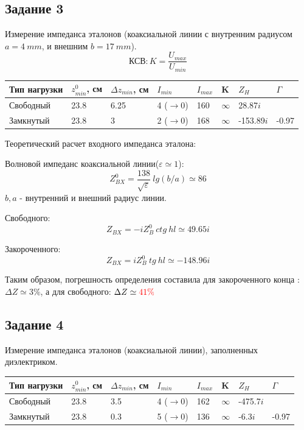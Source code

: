 \subsection{Задание 3}
Измерение импеданса эталонов (коаксиальной линии с внутренним радиусом $a = 4~mm$, и внешним $b=17~mm$).
$$\textbf{КСВ}: K = \frac{U_{max}}{U_{min}}$$
\begin{table}[H]
    \centering
    \begin{tabular}{l|l|l|l|l|l|l|l}
       Тип нагрузки  & $z^0_{min}$, см & $\Delta z_{min}$, см & $I_{min}$ & $I_{max}$ & K &  $Z_H$ & $\Gamma$ \\ \hline
       Свободный &   23.8   &   6.25    &   4 ($\rightarrow 0$)  &   160   &  $\infty$ &   28.87$i$ &  \\ \hline
       Замкнутый &   23.8   &   3    &   2 ($\rightarrow 0$)   &   168   &  $\infty$  &  -153.89$i$  & -0.97  
    \end{tabular}
\end{table}

Теоретический расчет входного импеданса эталона:

Волновой импеданс коаксиальной линии($\varepsilon \simeq 1$):
\begin{equation}
    Z^0_{BX} = \frac{138}{\sqrt{\varepsilon}} ~lg(b/a) \simeq 86   
\end{equation}
$b,a$ - внутренний и внешний радиус линии. 

Свободного:
\begin{equation}
    Z_{BX}= -i Z^0_B~ctg~hl  \simeq 49.65i  
\end{equation}

Закороченного:
\begin{equation}
    Z_{BX}= i Z^0_B~tg~hl    \simeq -148.96i
\end{equation}

Таким образом, погрешность определения составила для закороченного конца :$\Delta Z \simeq 3 \% $, а для свободного:
$\Delta Z \simeq \textcolor{red}{41 \%}$

\subsection{Задание 4}
Измерение импеданса эталонов (коаксиальной линии), заполненных диэлектриком.

\begin{table}[H]
    \centering
    \begin{tabular}{l|l|l|l|l|l|l|l}
       Тип нагрузки  & $z^0_{min}$, см & $\Delta z_{min}$, см & $I_{min}$ & $I_{max}$ & K &  $Z_H$  & $\Gamma$\\ \hline
    Свободный &   23.8   &   3.5    &   4 ($\rightarrow 0$)  &   162   &  $\infty$ &  -475.7$i$ & \\ \hline
    Замкнутый &   23.8   &   0.3    &   5 ($\rightarrow 0$)   &   136   &  $\infty$    &  -6.3$i$ & -0.97 
    \end{tabular}
\end{table}

